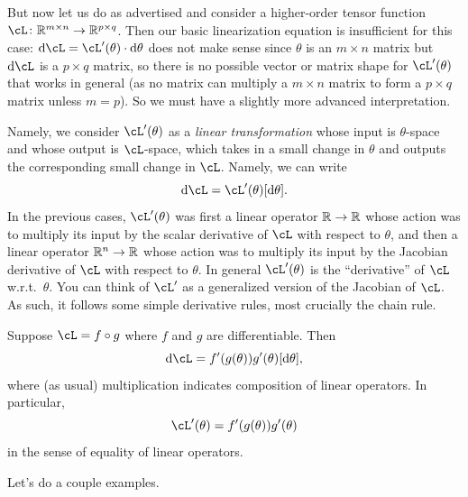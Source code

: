 \documentclass[../../book-main.tex]{subfiles}
\begin{document}
But now let us do as advertised and consider a higher-order tensor function \(\cL \colon \R^{m \times n} \to \R^{p \times q}\). Then our basic linearization equation is insufficient for this case: \(\odif{\cL} = \cL^{\prime}(\theta) \cdot \odif{\theta}\) does not make sense since \(\theta\) is an \(m \times n\) matrix but \(\odif{\cL}\) is a \(p \times q\) matrix, so there is no possible vector or matrix shape for \(\cL^{\prime}(\theta)\) that works in general (as no matrix can multiply a \(m \times n\) matrix to form a \(p \times q\) matrix unless \(m = p\)). So we must have a slightly more advanced interpretation. 

Namely, we consider \(\cL^{\prime}(\theta)\) as a \textit{linear transformation} whose input is \(\theta\)-space and whose output is \(\cL\)-space, which takes in a small change in \(\theta\) and outputs the corresponding small change in \(\cL\). Namely, we can write 
\begin{equation}
    \odif{\cL} = \cL^{\prime}(\theta)[\odif{\theta}].
\end{equation}
In the previous cases, \(\cL^{\prime}(\theta)\) was first a linear operator \(\mathbb{R} \to \mathbb{R}\) whose action was to multiply its input by the scalar derivative of \(\cL\) with respect to \(\theta\), and then a linear operator \(\mathbb{R}^{n} \to \mathbb{R}\) whose action was to multiply its input by the Jacobian derivative of \(\cL\) with respect to \(\theta\). In general \(\cL^{\prime}(\theta)\) is the ``derivative'' of \(\cL\) w.r.t.~\(\theta\). You can think of \(\cL^{\prime}\) as a generalized version of the Jacobian of \(\cL\). As such, it follows some simple derivative rules, most crucially the chain rule.

\begin{theorem}
    Suppose \(\cL = f \circ g\) where \(f\) and \(g\) are differentiable. Then 
    \begin{equation}
        \odif{\cL} = f^{\prime}(g(\theta))g^{\prime}(\theta)[\odif{\theta}],
    \end{equation}
    where (as usual) multiplication indicates composition of linear operators. In particular,
    \begin{equation}
        \cL^{\prime}(\theta) = f^{\prime}(g(\theta))g^{\prime}(\theta)
    \end{equation}
    in the sense of equality of linear operators. 
\end{theorem}

Let's do a couple examples.
\end{document}

